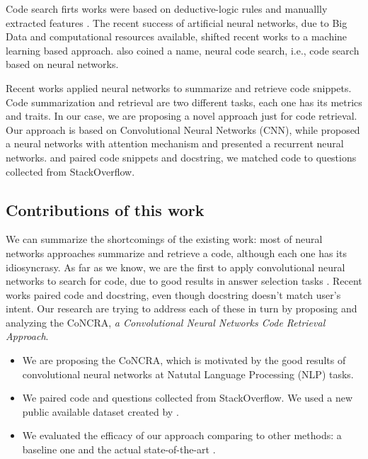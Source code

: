 \documentclass[sigconf]{acmart}
\begin{document}
Code search firts works were based on deductive-logic rules and manuallly extracted features \cite{Allamanis:2018:SML}. The recent success of artificial neural networks, due to Big Data and computational resources available, shifted recent works to a machine learning based approach. \cite{cambronero-deep-code-search-2019} also coined a name, neural code search, i.e., code search based on neural networks.

Recent works applied neural networks to summarize and retrieve code snippets. Code summarization and retrieval are two different tasks, each one has its metrics and traits. In our case, we are proposing a novel approach just for code retrieval. Our approach is based on Convolutional Neural Networks (CNN), while \cite{cambronero-deep-code-search-2019} proposed a neural networks with attention mechanism and \cite{Gu-deep-code-search:2018} presented a recurrent neural networks. \cite{cambronero-deep-code-search-2019} and \cite{Gu-deep-code-search:2018} paired code snippets and docstring, we matched code to questions collected from StackOverflow.

\subsection{Contributions of this work}

We can summarize the shortcomings of the existing work: most of neural networks approaches summarize and retrieve a code, although each one has its idiosyncrasy. As far as we know, we are the first to apply convolutional neural networks to search for code, due to good results in answer selection tasks \citep{feng-2015, wen-joint-modeling-question-answer-2019}. Recent works paired code and docstring, even though docstring doesn't match user's intent. Our research are trying to address each of these in turn by proposing and analyzing the CoNCRA, \emph{a Convolutional Neural Networks Code Retrieval Approach}.

\begin{itemize}
    \item We are proposing the CoNCRA, which is motivated
by the good results of convolutional neural networks at Natutal Language Processing (NLP) tasks. 
    \item We paired code and questions collected from StackOverflow. We used a new public available dataset created by \cite{yao-2018}.

    \item We evaluated the efficacy of our approach comparing to other methods: a baseline one and the actual state-of-the-art \cite{cambronero-deep-code-search-2019}.
    
\end{itemize}
\end{document}
